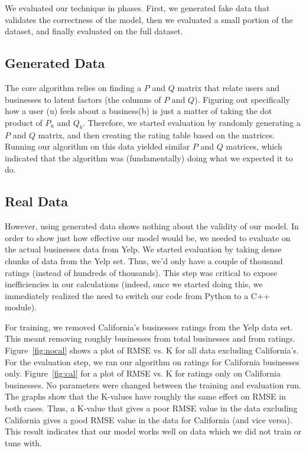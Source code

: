 We evaluated our technique in phases. First, we generated fake data that validates the correctness of the model, then we evaluated a small portion of the 
dataset, and finally evaluated on the full dataset.

\subsection{Generated Data}
The core algorithm relies on finding a $P$ and $Q$ matrix that relate users and businesses to latent factors (the columns of $P$ and $Q$). 
Figuring out specifically how a user (u) feels about a business(b) is just a matter of taking the dot product of $P_u$ and $Q_b$. 
Therefore, we started evaluation by randomly generating a $P$ and $Q$ matrix, and then creating the rating table based on the 
matrices. Running our algorithm on this data yielded similar $P$ and $Q$ matrices, which indicated that the algorithm was (fundamentally) doing what
we expected it to do.

\subsection{Real Data}
However, using generated data shows nothing about the validity of our model. In order to show just how effective our model would be, we needed to evaluate on the actual
businesses data from Yelp. We started evaluation by taking dense chunks of data from the Yelp set. Thus, we'd only have a couple of thousand ratings (instead of hundreds of thousands). 
This step was critical to expose inefficiencies in our calculations (indeed, once we started doing this, we immediately realized the need to switch our code from Python to a C++ module).

For training, we removed California's businesses ratings from the Yelp data set. This meant removing roughly \numBusCA businesses from \numBusTotal total businesses and \numRatingCA from \numRatingTotal ratings. Figure~\ref{fig:nocal} shows a plot of RMSE vs. K for all data excluding California's. For the evaluation step, we ran our algorithm on ratings for California businesses only. Figure~\ref{fig:cal} for a plot of RMSE vs. K for ratings only on California businesses. No parameters were changed between the training and evaluation run. The graphs show that the K-values have roughly the same effect on RMSE in both cases. Thus, a K-value that gives a poor RMSE value in the data excluding California gives a good RMSE value in the data for California (and vice versa). This result indicates that our model works well on data which we did not train or tune with.

